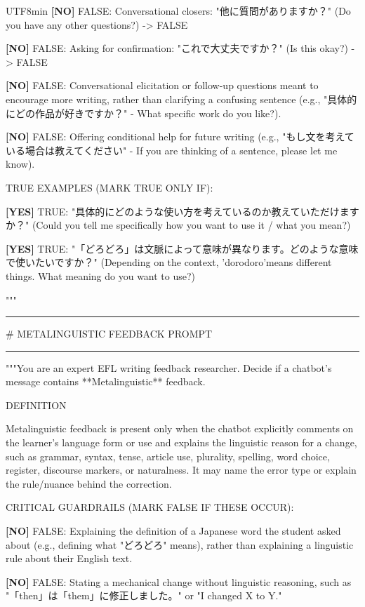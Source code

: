 \begin{CJK}{UTF8}{min}
\textbf{[NO]} FALSE: Conversational closers: "他に質問がありますか？" (Do you have any other questions?) -\textgreater{} FALSE

\textbf{[NO]} FALSE: Asking for confirmation: "これで大丈夫ですか？" (Is this okay?) -\textgreater{} FALSE

\textbf{[NO]} FALSE: Conversational elicitation or follow-up questions meant to encourage more writing, rather than clarifying a confusing sentence (e.g., "具体的にどの作品が好きですか？" - What specific work do you like?).

\textbf{[NO]} FALSE: Offering conditional help for future writing (e.g., "もし文を考えている場合は教えてください" - If you are thinking of a sentence, please let me know).

TRUE EXAMPLES (MARK TRUE ONLY IF):

\textbf{[YES]} TRUE: "具体的にどのような使い方を考えているのか教えていただけますか？" (Could you tell me specifically how you want to use it / what you mean?)

\textbf{[YES]} TRUE: "「どろどろ」は文脈によって意味が異なります。どのような意味で使いたいですか？" (Depending on the context, 'dorodoro'means different things. What meaning do you want to use?)

"""

\medskip\hrule\medskip

\# METALINGUISTIC FEEDBACK PROMPT

\medskip\hrule\medskip

"""You are an expert EFL writing feedback researcher. Decide if a chatbot's message contains **Metalinguistic** feedback.

DEFINITION

Metalinguistic feedback is present only when the chatbot explicitly comments on the learner's language form or use and explains the linguistic reason for a change, such as grammar, syntax, tense, article use, plurality, spelling, word choice, register, discourse markers, or naturalness. It may name the error type or explain the rule/nuance behind the correction.

CRITICAL GUARDRAILS (MARK FALSE IF THESE OCCUR):

\textbf{[NO]} FALSE: Explaining the definition of a Japanese word the student asked about (e.g., defining what "どろどろ" means), rather than explaining a linguistic rule about their English text.

\textbf{[NO]} FALSE: Stating a mechanical change without linguistic reasoning, such as "「then」は「them」に修正しました。" or "I changed X to Y."


\end{CJK}
